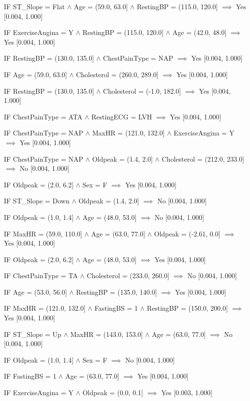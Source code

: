 IF ST_Slope = Flat $\land$ Age = (59.0, 63.0] $\land$ RestingBP = (115.0, 120.0] $\implies$ Yes [0.004, 1.000]

IF ExerciseAngina = Y $\land$ RestingBP = (115.0, 120.0] $\land$ Age = (42.0, 48.0] $\implies$ Yes [0.004, 1.000]

IF RestingBP = (130.0, 135.0] $\land$ ChestPainType = NAP $\implies$ Yes [0.004, 1.000]

IF Age = (59.0, 63.0] $\land$ Cholesterol = (260.0, 289.0] $\implies$ Yes [0.004, 1.000]

IF RestingBP = (130.0, 135.0] $\land$ Cholesterol = (-1.0, 182.0] $\implies$ Yes [0.004, 1.000]

IF ChestPainType = ATA $\land$ RestingECG = LVH $\implies$ Yes [0.004, 1.000]

IF ChestPainType = NAP $\land$ MaxHR = (121.0, 132.0] $\land$ ExerciseAngina = Y $\implies$ Yes [0.004, 1.000]

IF ChestPainType = NAP $\land$ Oldpeak = (1.4, 2.0] $\land$ Cholesterol = (212.0, 233.0] $\implies$ No [0.004, 1.000]

IF Oldpeak = (2.0, 6.2] $\land$ Sex = F $\implies$ Yes [0.004, 1.000]

IF ST_Slope = Down $\land$ Oldpeak = (1.4, 2.0] $\implies$ No [0.004, 1.000]

IF Oldpeak = (1.0, 1.4] $\land$ Age = (48.0, 53.0] $\implies$ No [0.004, 1.000]

IF MaxHR = (59.0, 110.0] $\land$ Age = (63.0, 77.0] $\land$ Oldpeak = (-2.61, 0.0] $\implies$ Yes [0.004, 1.000]

IF Oldpeak = (2.0, 6.2] $\land$ Age = (48.0, 53.0] $\implies$ Yes [0.004, 1.000]

IF ChestPainType = TA $\land$ Cholesterol = (233.0, 260.0] $\implies$ No [0.004, 1.000]

IF Age = (53.0, 56.0] $\land$ RestingBP = (135.0, 140.0] $\implies$ Yes [0.004, 1.000]

IF MaxHR = (121.0, 132.0] $\land$ FastingBS = 1 $\land$ RestingBP = (150.0, 200.0] $\implies$ Yes [0.004, 1.000]

IF ST_Slope = Up $\land$ MaxHR = (143.0, 153.0] $\land$ Age = (63.0, 77.0] $\implies$ No [0.004, 1.000]

IF Oldpeak = (1.0, 1.4] $\land$ Sex = F $\implies$ No [0.004, 1.000]

IF FastingBS = 1 $\land$ Age = (63.0, 77.0] $\implies$ Yes [0.004, 1.000]

IF ExerciseAngina = Y $\land$ Oldpeak = (0.0, 0.1] $\implies$ Yes [0.003, 1.000]

